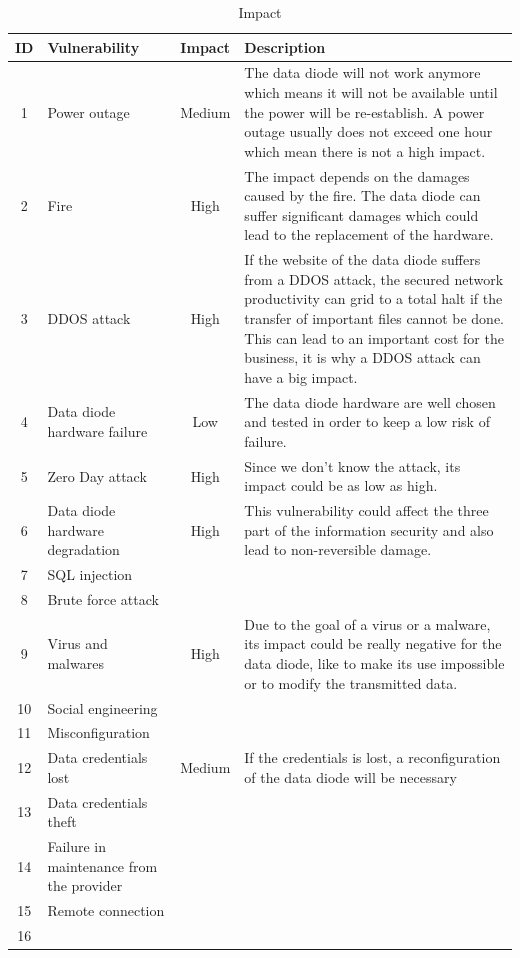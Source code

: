 \documentclass[a4paper,10pt]{article}
\begin{document}
\begin{table}[!h]
	\centering
	\begin{tabular}{|c|p{2.5cm}|c|p{10cm}|}
		\hline
		\textbf{ID}& \textbf{Vulnerability} &\textbf{Impact} & \textbf{Description}                 \\
		\hline
		1 & Power outage & Medium  &  The data diode will not work anymore which means it will not be available until the power will be re-establish. A power outage usually does not exceed one hour which mean there is not a high impact. \\
		\hline
		2 & Fire & High  &  The impact depends on the damages caused by the fire. The data diode can suffer significant damages which could lead to the replacement of the hardware.\\
		\hline
		3 & DDOS attack & High & If the website of the data diode suffers from a DDOS attack, the secured network productivity can grid to a total halt if the transfer of important files cannot be done. This can lead to an important cost for the business, it is why a DDOS attack can have a big impact.\\
		\hline
		4 & Data diode hardware failure  & Low & The data diode hardware are well chosen and tested in order to keep a low risk of failure.\\ 
		\hline
		5 & Zero Day attack & High & Since we don't know the attack, its impact could be as low as high.\\
		\hline
		6 & Data diode hardware degradation & High & This vulnerability could affect the three part of the information security and also lead to non-reversible damage. \\
		\hline
		7 &  SQL injection & & \\
		\hline
		8 & Brute force attack & & \\
		\hline
		9 & Virus and malwares & High & Due to the goal of a virus or a malware, its impact could be really negative for the data diode, like to make its use impossible or to modify the transmitted data. \\
		\hline
		10 & Social engineering  & & \\
		\hline
		11 & Misconfiguration & & \\
		\hline
		12 & Data credentials lost & Medium & If the credentials is lost, a reconfiguration of the data diode will be necessary \\
		\hline
		13 & Data credentials theft & & \\
		\hline
		14 & Failure in maintenance from the provider & & \\
		\hline
		15 & Remote connection & & \\
		\hline
		16 & & & \\
		\hline
	\end{tabular}
	\caption{Impact}
\end{table}
\end{document}
